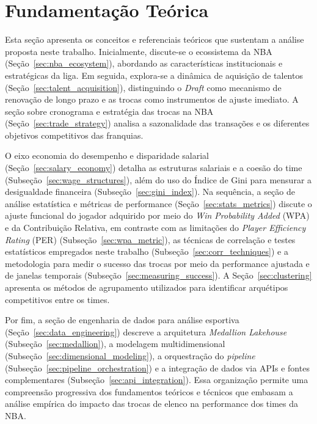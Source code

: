 \chapter{Fundamentação Teórica}
\label{chp:background}

Esta seção apresenta os conceitos e referenciais teóricos que sustentam a análise proposta neste trabalho. Inicialmente, discute-se o ecossistema da NBA (Seção~\ref{sec:nba_ecosystem}), abordando as características institucionais e estratégicas da liga. Em seguida, explora-se a dinâmica de aquisição de talentos (Seção~\ref{sec:talent_acquisition}), distinguindo o \textit{Draft} como mecanismo de renovação de longo prazo e as trocas como instrumentos de ajuste imediato. A seção sobre cronograma e estratégia das trocas na NBA (Seção~\ref{sec:trade_strategy}) analisa a sazonalidade das transações e os diferentes objetivos competitivos das franquias.

O eixo economia do desempenho e disparidade salarial (Seção~\ref{sec:salary_economy}) detalha as estruturas salariais e a coesão do time (Subseção~\ref{sec:wage_structures}), além do uso do Índice de Gini para mensurar a desigualdade financeira (Subseção~\ref{sec:gini_index}). Na sequência, a seção de análise estatística e métricas de performance (Seção~\ref{sec:stats_metrics}) discute o ajuste funcional do jogador adquirido por meio do \textit{Win Probability Added} (WPA) e da Contribuição Relativa, em contraste com as limitações do \textit{Player Efficiency Rating} (PER) (Subseção~\ref{sec:wpa_metric}), as técnicas de correlação e testes estatísticos empregados neste trabalho (Subseção~\ref{sec:corr_techniques}) e a metodologia para medir o sucesso das trocas por meio da performance ajustada e de janelas temporais (Subseção~\ref{sec:measuring_success}). A Seção~\ref{sec:clustering} apresenta os métodos de agrupamento utilizados para identificar arquétipos competitivos entre os times.

Por fim, a seção de engenharia de dados para análise esportiva (Seção~\ref{sec:data_engineering}) descreve a arquitetura \textit{Medallion Lakehouse} (Subseção~\ref{sec:medallion}), a modelagem multidimensional (Subseção~\ref{sec:dimensional_modeling}), a orquestração do \textit{pipeline} (Subseção~\ref{sec:pipeline_orchestration}) e a integração de dados via APIs e fontes complementares (Subseção~\ref{sec:api_integration}). Essa organização permite uma compreensão progressiva dos fundamentos teóricos e técnicos que embasam a análise empírica do impacto das trocas de elenco na performance dos times da NBA.

